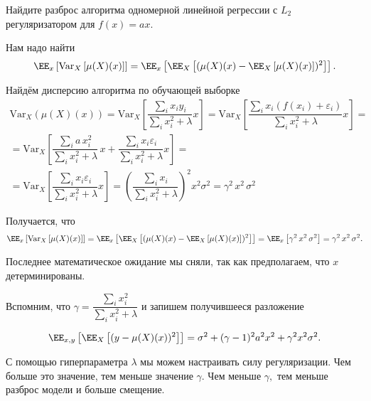 \documentclass[12pt,fleqn]{article}
\begin{document}
\begin{vkProblem}
Найдите разброс алгоритма одномерной линейной регрессии с $L_2$ регуляризатором для $f(x) = ax$. 
\end{vkProblem}
\begin{esSolution}
    Нам надо найти
    $$
    \EE_{x}\left[\text{Var}_X\left[\mu(X)(x)\right]\right]
    =
    \EE_{x} \left[\EE_{X} \left[(\mu(X)(x) - \EE_{X}\left[\mu(X)(x)\right] )^2 \right]\right].
    $$

    Найдём дисперсию алгоритма по обучающей выборке 
    \begin{multline*}
        \text{Var}_X(\mu(X)(x))
        =
        \text{Var}_X \left[ \dfrac{\sum_i x_i y_i}{\sum_i x_i^2 + \lambda} x \right]
        =
        \text{Var}_X \left[ \dfrac{\sum_i x_i (f(x_i) + \varepsilon_i)}{\sum_i x_i^2 + \lambda} x \right]
        = \\ =
        \text{Var}_X \left[ \dfrac{\sum_i a \, x_i^2}{\sum_i x_i^2 + \lambda} \, x  + \dfrac{\sum_i x_i \varepsilon_i}{\sum_i x_i^2 + \lambda} x \right]
        = \\ =
        \text{Var}_X \left[ \dfrac{\sum_i x_i \varepsilon_i}{\sum_i x_i^2 + \lambda} x \right]
        =
        \left(\dfrac{\sum_i x_i}{\sum_i x_i^2 + \lambda}\right)^2 x^2 \sigma^2
        =
        \gamma^2 \, x^2 \, \sigma^2
    \end{multline*}

    Получается, что 
    $$
    \EE_{x}\left[\text{Var}_X\left[\mu(X)(x)\right]\right]
    =
    \EE_{x} \left[\EE_{X} \left[(\mu(X)(x) - \EE_{X}\left[\mu(X)(x)\right] )^2 \right]\right] = \EE_{x}\left[\gamma^2 \, x^2 \, \sigma^2\right] = \gamma^2 \, x^2 \, \sigma^2.
    $$

    Последнее математическое ожидание мы сняли, так как предполагаем, что $x$ детерминированы. 
\end{esSolution}

Вспомним, что $\gamma = \dfrac{\sum_i x_i^2}{\sum_i x_i^2 + \lambda}$ и запишем получившееся разложение

$$
\EE_{x, y}\left[\EE_{X}\left[ (y - \mu(X)(x))^2 \right]\right]
=
\sigma^2 + (\gamma - 1)^2 a^2 x^2 + \gamma^2 x^2 \sigma^2.
$$

С помощью гиперпараметра $\lambda$ мы можем настраивать силу регуляризации.
Чем больше это значение, тем меньше значение $\gamma$.
Чем меньше $\gamma,$ тем меньше разброс модели и больше смещение.
\end{document}
